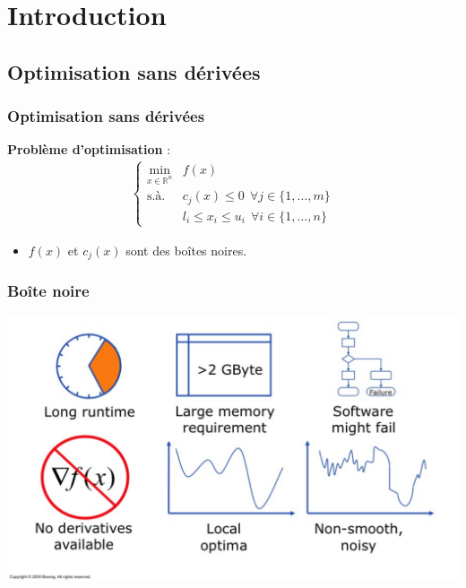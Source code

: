 \documentclass{beamer}
\newcommand{\R}{\mathbb{R}}
\begin{document}

\section[Introduction]{Introduction} 
\tableofcontents[currentsection,currentsubsection,subsectionstyle=show/hide]
\subsection{Optimisation sans dérivées}
\begin{frame} %
\frametitle{Optimisation sans dérivées}
\textbf{Problème d'optimisation} :
\begin{align*}
	\begin{cases}
		\underset{x\in \R^n}{\min} & f(x) \\
		\text{s.à.} & c_j(x) \leq 0 ~ ~ \forall j \in \{1,\dots,m\}\\
		~ & l_i \leq x_i \leq u_i ~ ~ \forall i \in \{1,\dots,n\}
	\end{cases}
\end{align*}
\begin{itemize}
	\pause
	\item $f(x)$ et $c_j(x)$ sont des boîtes noires.
\end{itemize}
\bigskip

\end{frame}
\begin{frame}%
	\frametitle{Boîte noire}
	\includegraphics[width=\linewidth]{blackbox.png}
\end{frame}
\end{document}
